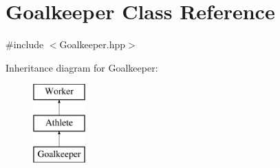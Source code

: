 \hypertarget{class_goalkeeper}{}\section{Goalkeeper Class Reference}
\label{class_goalkeeper}


{\ttfamily \#include $<$Goalkeeper.\+hpp$>$}

Inheritance diagram for Goalkeeper\+:\begin{figure}[H]
\begin{center}
\leavevmode
\includegraphics[height=3.000000cm]{class_goalkeeper}
\end{center}
\end{figure}
